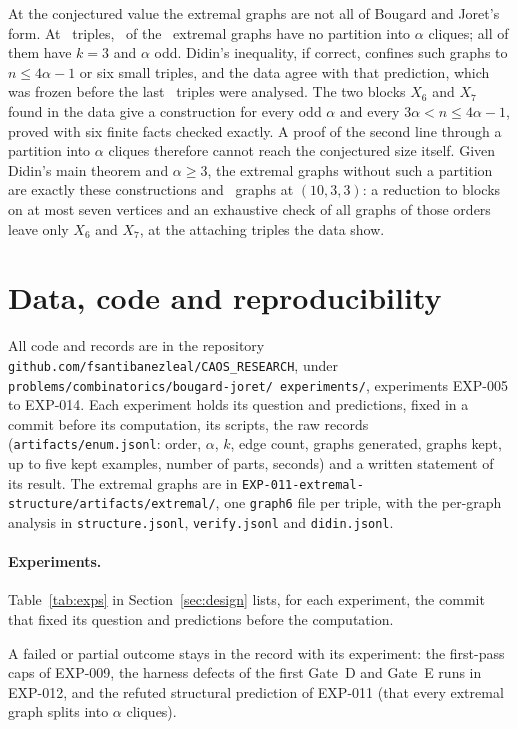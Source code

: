 \documentclass[11pt]{article}
\theoremstyle{definition}
\theoremstyle{remark}
\newcommand{\docrepo}{github.com/fsantibanezleal/CAOS\_RESEARCH}
\begin{document}
At the conjectured value the extremal graphs are not all of Bougard and Joret's form. At \nexttriples\ triples, \nnopart\
of the \nextremal\ extremal graphs have no partition into $\alpha$ cliques; all of them have $k=3$ and $\alpha$ odd.
Didin's inequality, if correct, confines such graphs to $n\le4\alpha-1$ or six small triples, and the data agree with
that prediction, which was frozen before the last \nphasetwotriples\ triples were analysed. The two blocks $X_6$ and
$X_7$ found in the data give a construction for every odd $\alpha$ and every $3\alpha<n\le4\alpha-1$, proved with six
finite facts checked exactly. A proof of the second line through a partition into $\alpha$ cliques therefore cannot
reach the conjectured size itself. Given Didin's main theorem and $\alpha\ge3$, the extremal graphs without such a partition
are exactly these constructions and \ntenthreeb\ graphs at $(10,3,3)$: a reduction to blocks on at most seven vertices
and an exhaustive check of all graphs of those orders leave only $X_6$ and $X_7$, at the attaching triples the data
show.

\section{Data, code and reproducibility}\label{sec:repro}

All code and records are in the repository \texttt{\docrepo}, under \texttt{problems/combinatorics/bougard-joret/
experiments/}, experiments EXP-005 to EXP-014. Each experiment holds its question and predictions, fixed in a
commit before its computation, its scripts, the raw records (\texttt{artifacts/enum.jsonl}: order, $\alpha$, $k$,
edge count, graphs generated, graphs kept, up to five kept examples, number of parts, seconds) and a written
statement of its result. The extremal graphs are in
\texttt{EXP-011-extremal-structure/artifacts/extremal/}, one \texttt{graph6} file per triple, with the per-graph
analysis in \texttt{structure.jsonl}, \texttt{verify.jsonl} and \texttt{didin.jsonl}.


\paragraph{Experiments.} Table~\ref{tab:exps} in Section~\ref{sec:design} lists, for each experiment, the commit
that fixed its question and predictions before the computation.



A failed or partial outcome stays in the record with its experiment: the first-pass caps of EXP-009, the harness
defects of the first Gate~D and Gate~E runs in EXP-012, and the refuted structural prediction of EXP-011 (that every
extremal graph splits into $\alpha$ cliques).
\end{document}
